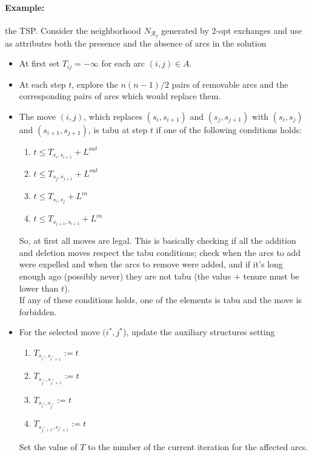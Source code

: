 \paragraph{Example:} the TSP. Consider the neighborhood $N_{\mathcal{R}_2}$ generated by 2-opt exchanges and use as attributes both the presence and the absence of arcs in the solution
\begin{itemize}
	\item At first set $T_{ij} = -\infty$ for each arc $(i, j) \in A$.\\
	
	\item At each step $t$, explore the $n(n − 1)/2$ pairs of removable arcs and the corresponding pairs of arcs which would replace them.\\
	
	\item The move $(i, j)$, which replaces $(s_i , s_{i+1})$ and $(s_j , s_{j+1})$ with $(s_i , s_j )$ and $(s_{i+1}, s_{j+1})$, is tabu at step $t$ if one of the following conditions holds:
	\begin{enumerate}
		\item $t \leq T_{s_i ,s_{i+1}} + L^{out}$
		\item $t \leq T_{s_j ,s_{j+1}} + L^{out}$
		\item $t \leq T_{s_i ,s_j} + L^{in}$
		\item $t \leq T_{s_{j+1},s_{i+1}} + L^{in}$
	\end{enumerate}
	So, at first all moves are legal. This is basically checking if all the addition and deletion moves respect the tabu conditions; check when the arcs to add were expelled and when the arcs to remove were added, and if it's long enough ago (possibly never) they are not tabu (the value $+$ tenure must be lower than $t$).\\
	If any of these conditions holds, one of the elements is tabu and the move is forbidden.\\
	
	\item For the selected move $(i^\ast, j^\ast$), update the auxiliary structures setting
	\begin{enumerate}
		\item $T_{s_{i^\ast} ,s_{i^\ast + 1}} := t$
		\item $T_{s_{j^\ast} ,s_{j^\ast + 1}} := t$
		\item $T_{s_{i^\ast} ,s_{j^\ast}} := t$
		\item $T_{s_{j^\ast + 1},s_{i^\ast + 1}} := t$
	\end{enumerate}
	Set the value of $T$ to the number of the current iteration for the affected arcs.\\
\end{itemize}

